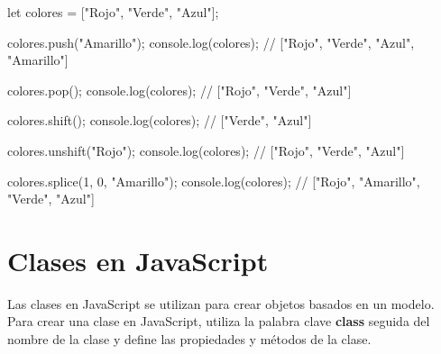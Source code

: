 \documentclass[
  a4paper,
  DIV=11,
  numbers=noendperiod,
  onepage,
  openany]{scrreprt}
\newenvironment{Shaded}{\begin{snugshade}}{\end{snugshade}}
\newcommand{\BuiltInTok}[1]{\textcolor[rgb]{0.00,0.23,0.31}{#1}}
\newcommand{\CommentTok}[1]{\textcolor[rgb]{0.37,0.37,0.37}{#1}}
\newcommand{\DecValTok}[1]{\textcolor[rgb]{0.68,0.00,0.00}{#1}}
\newcommand{\FunctionTok}[1]{\textcolor[rgb]{0.28,0.35,0.67}{#1}}
\newcommand{\KeywordTok}[1]{\textcolor[rgb]{0.00,0.23,0.31}{#1}}
\newcommand{\NormalTok}[1]{\textcolor[rgb]{0.00,0.23,0.31}{#1}}
\newcommand{\OperatorTok}[1]{\textcolor[rgb]{0.37,0.37,0.37}{#1}}
\newcommand{\StringTok}[1]{\textcolor[rgb]{0.13,0.47,0.30}{#1}}
\begin{document}
\begin{Shaded}
\begin{Highlighting}[]
\KeywordTok{let}\NormalTok{ colores }\OperatorTok{=}\NormalTok{ [}\StringTok{"Rojo"}\OperatorTok{,} \StringTok{"Verde"}\OperatorTok{,} \StringTok{"Azul"}\NormalTok{]}\OperatorTok{;}

\NormalTok{colores}\OperatorTok{.}\FunctionTok{push}\NormalTok{(}\StringTok{"Amarillo"}\NormalTok{)}\OperatorTok{;}
\BuiltInTok{console}\OperatorTok{.}\FunctionTok{log}\NormalTok{(colores)}\OperatorTok{;} \CommentTok{// ["Rojo", "Verde", "Azul", "Amarillo"]}

\NormalTok{colores}\OperatorTok{.}\FunctionTok{pop}\NormalTok{()}\OperatorTok{;}
\BuiltInTok{console}\OperatorTok{.}\FunctionTok{log}\NormalTok{(colores)}\OperatorTok{;} \CommentTok{// ["Rojo", "Verde", "Azul"]}

\NormalTok{colores}\OperatorTok{.}\FunctionTok{shift}\NormalTok{()}\OperatorTok{;}
\BuiltInTok{console}\OperatorTok{.}\FunctionTok{log}\NormalTok{(colores)}\OperatorTok{;} \CommentTok{// ["Verde", "Azul"]}

\NormalTok{colores}\OperatorTok{.}\FunctionTok{unshift}\NormalTok{(}\StringTok{"Rojo"}\NormalTok{)}\OperatorTok{;}
\BuiltInTok{console}\OperatorTok{.}\FunctionTok{log}\NormalTok{(colores)}\OperatorTok{;} \CommentTok{// ["Rojo", "Verde", "Azul"]}

\NormalTok{colores}\OperatorTok{.}\FunctionTok{splice}\NormalTok{(}\DecValTok{1}\OperatorTok{,} \DecValTok{0}\OperatorTok{,} \StringTok{"Amarillo"}\NormalTok{)}\OperatorTok{;}
\BuiltInTok{console}\OperatorTok{.}\FunctionTok{log}\NormalTok{(colores)}\OperatorTok{;} \CommentTok{// ["Rojo", "Amarillo", "Verde", "Azul"]}
\end{Highlighting}
\end{Shaded}

\section{Clases en JavaScript}\label{clases-en-javascript}

Las clases en JavaScript se utilizan para crear objetos basados en un
modelo. Para crear una clase en JavaScript, utiliza la palabra clave
\textbf{class} seguida del nombre de la clase y define las propiedades y
métodos de la clase.
\end{document}
